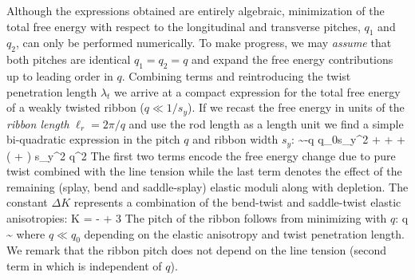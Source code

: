 Although the expressions obtained are entirely algebraic,  minimization of the total free energy with respect to the longitudinal and transverse pitches, $q_{1}$ and $q_{2}$,  can only be performed numerically. To make progress, we may {\em assume} that both pitches are identical $q_{1} = q_{2} =q$ and expand the free energy contributions up to leading order in $q$.
Combining terms and reintroducing the twist penetration length $\lambda_{t}$ we arrive at a compact expression for the total free energy of a weakly twisted ribbon ($q \ll 1/s_{y}$). If we recast the free energy in units of the {\em ribbon length} $\ell_{r} = 2 \pi/q$ and use the rod length as a length unit we find a simple bi-quadratic expression in the pitch $q$ and ribbon width $s_{y}$: 
\beq
{} \sim   -q q_{0}s_{y}^{2} +    +    +  \left (  + \right ) s_{y}^{2} q^{2} 
\label{flowq}
\eeq
The first two terms encode the free energy change due to pure twist combined with the line tension while the last term denotes the effect of the remaining (splay, bend and saddle-splay) elastic moduli along with depletion.  The constant $\Delta K$ represents a combination of the  bend-twist and saddle-twist elastic anisotropies:
\beq
\Delta K =  -  + 3
\label{dk}
\eeq
 The pitch of the ribbon follows from minimizing  with $q$:
\beq
q \sim {} 
\eeq
where  $q \ll q_{0}$ depending on the elastic anisotropy and twist penetration length. We remark that the ribbon pitch does not depend on the line tension (second term in  which is independent of $q$).  






